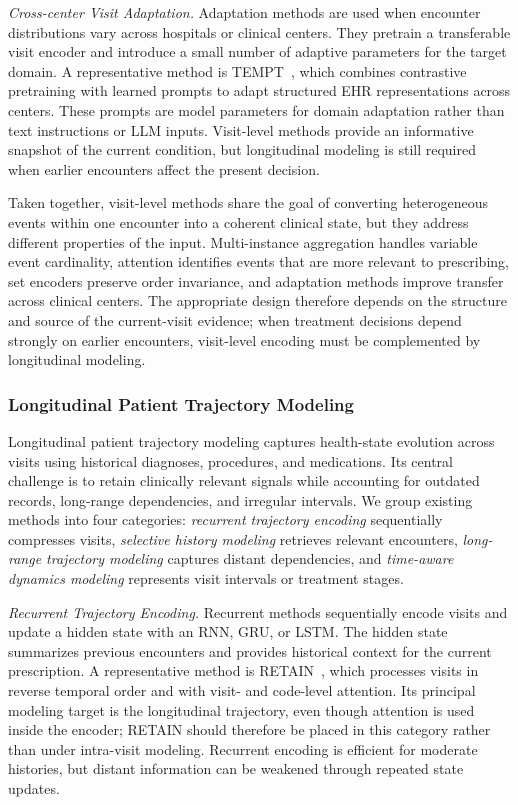 \documentclass[manuscript,review]{acmart}
\begin{document}
\textit{Cross-center Visit Adaptation.} Adaptation methods are used when encounter distributions vary across hospitals or clinical centers. They pretrain a transferable visit encoder and introduce a small number of adaptive parameters for the target domain. A representative method is TEMPT~\cite{liu2025tempt}, which combines contrastive pretraining with learned prompts to adapt structured EHR representations across centers. These prompts are model parameters for domain adaptation rather than text instructions or LLM inputs. Visit-level methods provide an informative snapshot of the current condition, but longitudinal modeling is still required when earlier encounters affect the present decision.

Taken together, visit-level methods share the goal of converting heterogeneous events within one encounter into a coherent clinical state, but they address different properties of the input. Multi-instance aggregation handles variable event cardinality, attention identifies events that are more relevant to prescribing, set encoders preserve order invariance, and adaptation methods improve transfer across clinical centers. The appropriate design therefore depends on the structure and source of the current-visit evidence; when treatment decisions depend strongly on earlier encounters, visit-level encoding must be complemented by longitudinal modeling.

\subsubsection{Longitudinal Patient Trajectory Modeling}

Longitudinal patient trajectory modeling captures health-state evolution across visits using historical diagnoses, procedures, and medications. Its central challenge is to retain clinically relevant signals while accounting for outdated records, long-range dependencies, and irregular intervals. We group existing methods into four categories: \textit{recurrent trajectory encoding} sequentially compresses visits, \textit{selective history modeling} retrieves relevant encounters, \textit{long-range trajectory modeling} captures distant dependencies, and \textit{time-aware dynamics modeling} represents visit intervals or treatment stages.

\textit{Recurrent Trajectory Encoding.} Recurrent methods sequentially encode visits and update a hidden state with an RNN, GRU, or LSTM. The hidden state summarizes previous encounters and provides historical context for the current prescription. A representative method is RETAIN~\cite{choi2016retain}, which processes visits in reverse temporal order and with visit- and code-level attention. Its principal modeling target is the longitudinal trajectory, even though attention is used inside the encoder; RETAIN should therefore be placed in this category rather than under intra-visit modeling. Recurrent encoding is efficient for moderate histories, but distant information can be weakened through repeated state updates.
\end{document}
